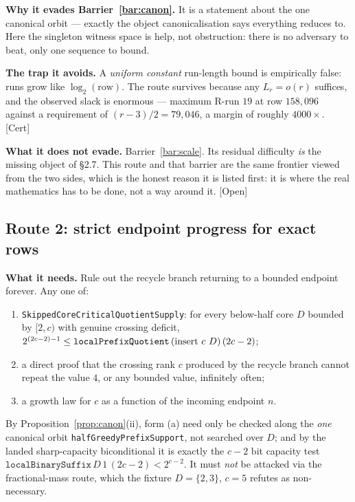 \documentclass[11pt]{article}
\theoremstyle{plain}
\theoremstyle{definition}
\theoremstyle{remark}
\let\origmathrm\mathrm
\renewcommand{\mathrm}[1]{\ifmmode\origmathrm{#1}\else\textrm{#1}\fi}%
\newcommand{\ev}[1]{{\small\textsf{[#1]}}\xspace}
\newcommand{\codeid}[1]{\nolinkurl{#1}}
\begin{document}
\textbf{Why it evades Barrier~\ref{bar:canon}.} It is a statement about the one canonical orbit ---
exactly the object canonicalisation says everything reduces to. Here the singleton witness space is
help, not obstruction: there is no adversary to beat, only one sequence to bound.

\textbf{The trap it avoids.} A \emph{uniform constant} run-length bound is empirically false: runs
grow like $\log_2(\text{row})$. The route survives because any $L_r = o(r)$ suffices, and the
observed slack is enormous --- maximum R-run $19$ at row $158{,}096$ against a requirement of
$(r-3)/2 = 79{,}046$, a margin of roughly $4000\times$. \ev{Cert}

\textbf{What it does not evade.} Barrier~\ref{bar:scale}. Its residual difficulty \emph{is} the
missing object of \S2.7. This route and that barrier are the same frontier viewed from the two
sides, which is the honest reason it is listed first: it is where the real mathematics has to be
done, not a way around it. \ev{Open}

\subsection{Route 2: strict endpoint progress for exact rows}
\label{ssec:route-2}

\textbf{What it needs.} Rule out the recycle branch returning to a bounded endpoint forever. Any
one of:
\begin{enumerate}[nosep,label=(\alph*)]
\item \codeid{SkippedCoreCriticalQuotientSupply}: for every below-half core $D$ bounded by $[2,c)$
  with genuine crossing deficit, $2^{(2c-2)-1} \le \texttt{localPrefixQuotient}\,(\mathrm{insert}\
  c\ D)\,(2c-2)$;
\item a direct proof that the crossing rank $c$ produced by the recycle branch cannot repeat the
  value $4$, or any bounded value, infinitely often;
\item a growth law for $c$ as a function of the incoming endpoint $n$.
\end{enumerate}
By Proposition~\ref{prop:canon}(ii), form (a) need only be checked along the \emph{one} canonical
orbit \texttt{halfGreedyPrefixSupport}, not searched over $D$; and by the landed sharp-capacity
biconditional it is exactly the $c-2$ bit capacity test
$\texttt{localBinarySuffix}\,D\,1\,(2c-2) < 2^{c-2}$. It must \emph{not} be attacked via the
fractional-mass route, which the fixture $D = \{2,3\}$, $c=5$ refutes as non-necessary.
\end{document}
